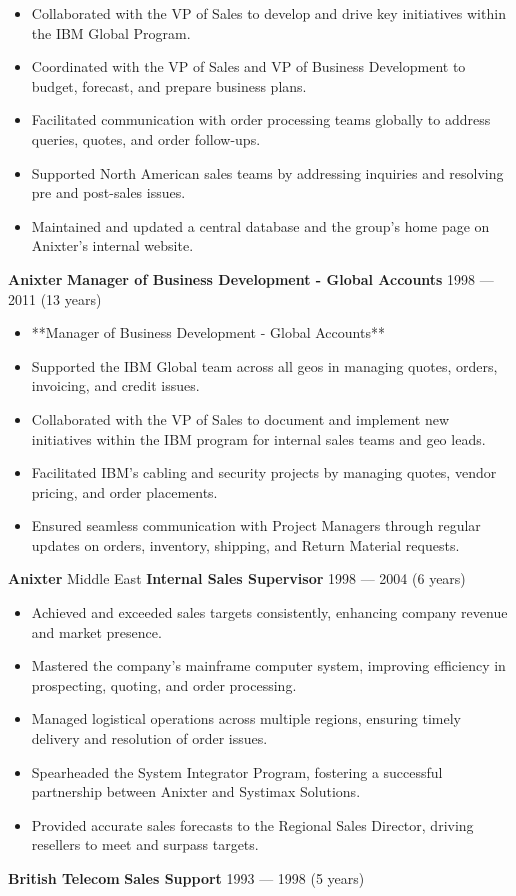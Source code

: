 \documentclass[11pt]{article}
\begin{document}
\begin{itemize}[noitemsep, topsep=0pt, partopsep=0pt, leftmargin=12pt]
    \item Collaborated with the VP of Sales to develop and drive key initiatives within the IBM Global Program.
    \item Coordinated with the VP of Sales and VP of Business Development to budget, forecast, and prepare business plans.
    \item Facilitated communication with order processing teams globally to address queries, quotes, and order follow-ups.
    \item Supported North American sales teams by addressing inquiries and resolving pre and post-sales issues.
    \item Maintained and updated a central database and the group’s home page on Anixter’s internal website.
\end{itemize}
\vspace{6pt}
\textbf{Anixter} \hfill 
\textbf{Manager of Business Development - Global Accounts} \hfill 1998 — 2011 (13 years)
\begin{itemize}[noitemsep, topsep=0pt, partopsep=0pt, leftmargin=12pt]
    \item **Manager of Business Development - Global Accounts**
    \item Supported the IBM Global team across all geos in managing quotes, orders, invoicing, and credit issues.
    \item Collaborated with the VP of Sales to document and implement new initiatives within the IBM program for internal sales teams and geo leads.
    \item Facilitated IBM's cabling and security projects by managing quotes, vendor pricing, and order placements.
    \item Ensured seamless communication with Project Managers through regular updates on orders, inventory, shipping, and Return Material requests.
\end{itemize}
\vspace{6pt}
\textbf{Anixter} \hfill Middle East
\textbf{Internal Sales Supervisor} \hfill 1998 — 2004 (6 years)
\begin{itemize}[noitemsep, topsep=0pt, partopsep=0pt, leftmargin=12pt]
    \item Achieved and exceeded sales targets consistently, enhancing company revenue and market presence.
    \item Mastered the company’s mainframe computer system, improving efficiency in prospecting, quoting, and order processing.
    \item Managed logistical operations across multiple regions, ensuring timely delivery and resolution of order issues.
    \item Spearheaded the System Integrator Program, fostering a successful partnership between Anixter and Systimax Solutions.
    \item Provided accurate sales forecasts to the Regional Sales Director, driving resellers to meet and surpass targets.
\end{itemize}
\vspace{6pt}
\textbf{British Telecom} \hfill 
\textbf{Sales Support} \hfill 1993 — 1998 (5 years)
\end{document}
